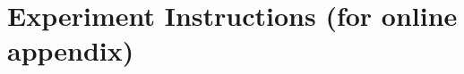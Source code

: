\documentclass[12pt,a4paper]{article}
\begin{document}
\begin{appendices}
\begin{enumerate}
\end{enumerate}

\newpage
\section{Experiment Instructions (for online appendix)}



\renewcommand{\contentsname}{\vspace{-1em}}

\setcounter{table}{0}
\setcounter{figure}{0}
\setcounter{equation}{0}
\setcounter{footnote}{0}
\setcounter{section}{0}
\renewcommand\thesection{\Alph{section}}
\renewcommand\theequation{\thesection.\arabic{equation}}
\renewcommand\thetable{\thesection.\arabic{table}}
\renewcommand\thefigure{\thesection.\arabic{figure}}
\renewcommand\thesubsection{\Roman{subsection}}

\end{appendices}
\end{document}

